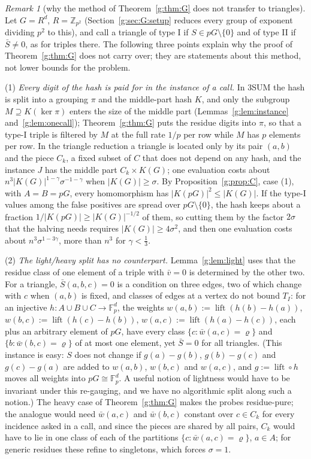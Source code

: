 \documentclass[11pt]{article}
\theoremstyle{definition}
\theoremstyle{remark}
\newtheorem{remark}[theorem]{Remark}
\newcommand{\Z}{\mathbb{Z}}
\newcommand{\Fp}{\mathbb{F}_p}
\DeclareMathOperator{\lift}{lift}
\begin{document}
\begin{remark}[why the method of Theorem~\ref{g:thm:G} does not transfer to triangles]\label{g:rem:trinogo}
Let $G=R^d$, $R=\Z_{p^2}$ (Section~\ref{g:sec:G:setup} reduces every group of exponent dividing $p^2$ to this), and call a triangle of type I if $S\in pG\setminus\{0\}$ and of type II if $\bar S\ne0$, as for triples there. The following three points explain why the proof of Theorem~\ref{g:thm:G} does not carry over; they are statements about this method, not lower bounds for the problem.

(1) \emph{Every digit of the hash is paid for in the instance of a call.} In 3SUM the hash is split into a grouping $\pi$ and the middle-part hash $K$, and only the subgroup $M\supseteq K(\ker\pi)$ enters the size of the middle part (Lemmas~\ref{g:lem:instance} and~\ref{g:lem:onecall}); Theorem~\ref{g:thm:G} puts the residue digits into $\pi$, so that a type-I triple is filtered by $M$ at the full rate $1/p$ per row while $M$ has $p$ elements per row. In the triangle reduction a triangle is located only by its pair $(a,b)$ and the piece $C_k$, a fixed subset of $C$ that does not depend on any hash, and the instance $J$ has the middle part $C_k\times K(G)$; one evaluation costs about $n^3|K(G)|^{1-\gamma}\sigma^{-1-\gamma}$ when $|K(G)|\ge\sigma$. By Proposition~\ref{g:prop:C}, case (1), with $A=B=pG$, every homomorphism has $|K(pG)|^2\le|K(G)|$. If the type-I values among the false positives are spread over $pG\setminus\{0\}$, the hash keeps about a fraction $1/|K(pG)|\ge|K(G)|^{-1/2}$ of them, so cutting them by the factor $2\sigma$ that the halving needs requires $|K(G)|\ge4\sigma^2$, and then one evaluation costs about $n^3\sigma^{1-3\gamma}$, more than $n^3$ for $\gamma<\frac13$.

(2) \emph{The light/heavy split has no counterpart.} Lemma~\ref{g:lem:light} uses that the residue class of one element of a triple with $\bar v=0$ is determined by the other two. For a triangle, $\bar S(a,b,c)=0$ is a condition on three edges, two of which change with $c$ when $(a,b)$ is fixed, and classes of edges at a vertex do not bound $T_I$: for an injective $h\colon A\cup B\cup C\to\Fp^d$, the weights $w(a,b):=\lift(h(b)-h(a))$, $w(b,c):=\lift(h(c)-h(b))$, $w(a,c):=\lift(h(a)-h(c))$, each plus an arbitrary element of $pG$, have every class $\{c:\bar w(a,c)=\varrho\}$ and $\{b:\bar w(b,c)=\varrho\}$ of at most one element, yet $\bar S=0$ for all triangles. (This instance is easy: $S$ does not change if $g(a)-g(b)$, $g(b)-g(c)$ and $g(c)-g(a)$ are added to $w(a,b)$, $w(b,c)$ and $w(a,c)$, and $g:=\lift\circ h$ moves all weights into $pG\cong\Fp^d$. A useful notion of lightness would have to be invariant under this re-gauging, and we have no algorithmic split along such a notion.) The heavy case of Theorem~\ref{g:thm:G} makes the probes residue-pure; the analogue would need $\bar w(a,c)$ and $\bar w(b,c)$ constant over $c\in C_k$ for every incidence asked in a call, and since the pieces are shared by all pairs, $C_k$ would have to lie in one class of each of the partitions $\{c:\bar w(a,c)=\varrho\}$, $a\in A$; for generic residues these refine to singletons, which forces $\sigma=1$.


\end{remark}
\end{document}
